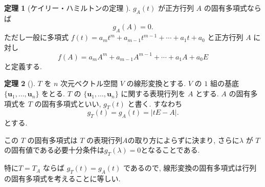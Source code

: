 \documentclass[dvipdfmx,a4paper,11pt]{article} %
\theoremstyle{definition}
\newtheorem{thm}{定理}[section]
\begin{document}
\begin{thm}
[{ケイリー・ハミルトンの定理 \cite[定理5.3.2]{M}}]
$g_A(t)$ が正方行列 $A$ の固有多項式ならば
\[
g_A(A)=0.
\]
ただし一般に多項式
\(
f(t)=a_mt^m+a_{m-1}t^{m-1}+\cdots+a_1t+a_0
\)
と正方行列 $A$ に対し
\[
f(A)=a_mA^m+a_{m-1}A^{m-1}+\cdots+a_1A+a_0E
\]
と定義する.
\end{thm}


\begin{thm}
[{\cite[定理5.3.3]{M}}]
\(T\) を \(n\) 次元ベクトル空間 \(V\) の線形変換とする. \(V\) の \(1\) 組の基底
\(
\{\bm{u}_1,\ldots,\bm{u}_n\}
\)
をとる. \(T\) の \(\{\bm{u}_1,\ldots,\bm{u}_n\}\) に関する表現行列を \(A\) とする. \(A\) の固有多項式を \(T\) の固有多項式といい, \(g_T(t)\) と書く. すなわち
\[
g_T(t)=g_A(t)=\lvert tE-A\rvert.
\]
とする. 

この \(T\) の固有多項式は \(T\) の表現行列$A$の取り方によらずに決まり, さらに\(\lambda\) が \(T\) の固有値である必要十分条件は\(g_T(\lambda)=0\)となることである.
\end{thm}
特に\(T=T_A\) ならば
\(
g_T(t)=g_A(t)
\)
であるので, 線形変換の固有多項式は行列の固有多項式を考えることに等しい. 
\end{document}
